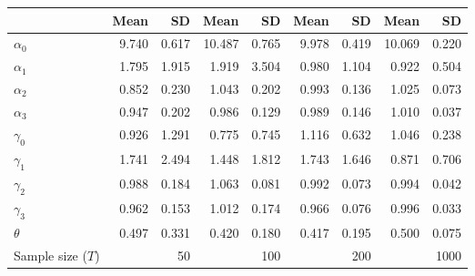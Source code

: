 
\begin{tabular}[t]{lrrrrrrrr}
\toprule
  & Mean & SD & Mean  & SD  & Mean   & SD   & Mean    & SD   \\
\midrule
$\alpha_{0}$ & 9.740 & 0.617 & 10.487 & 0.765 & 9.978 & 0.419 & 10.069 & 0.220\\
$\alpha_{1}$ & 1.795 & 1.915 & 1.919 & 3.504 & 0.980 & 1.104 & 0.922 & 0.504\\
$\alpha_{2}$ & 0.852 & 0.230 & 1.043 & 0.202 & 0.993 & 0.136 & 1.025 & 0.073\\
$\alpha_{3}$ & 0.947 & 0.202 & 0.986 & 0.129 & 0.989 & 0.146 & 1.010 & 0.037\\
$\gamma_{0}$ & 0.926 & 1.291 & 0.775 & 0.745 & 1.116 & 0.632 & 1.046 & 0.238\\
$\gamma_{1}$ & 1.741 & 2.494 & 1.448 & 1.812 & 1.743 & 1.646 & 0.871 & 0.706\\
$\gamma_{2}$ & 0.988 & 0.184 & 1.063 & 0.081 & 0.992 & 0.073 & 0.994 & 0.042\\
$\gamma_{3}$ & 0.962 & 0.153 & 1.012 & 0.174 & 0.966 & 0.076 & 0.996 & 0.033\\
$\theta$ & 0.497 & 0.331 & 0.420 & 0.180 & 0.417 & 0.195 & 0.500 & 0.075\\
Sample size ($T$) &  & 50 &  & 100 &  & 200 &  & 1000\\
\bottomrule
\end{tabular}
